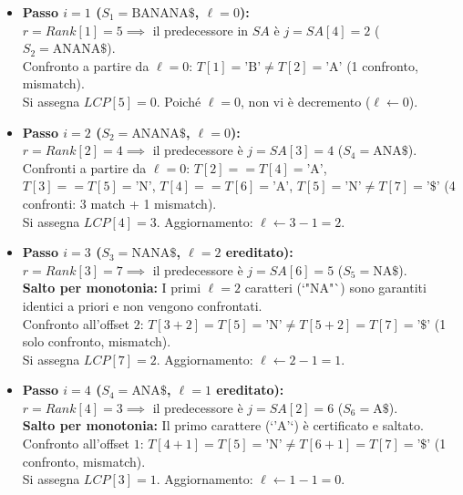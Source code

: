 \begin{itemize}
  \item \textbf{Passo $i = 1$ ($S_1 = \text{BANANA}\$$, $\ell = 0$):} \\
  $r = Rank[1] = 5 \implies$ il predecessore in $SA$ \`e $j = SA[4] = 2$ ($S_2 = \text{ANANA}\$$). \\
  Confronto a partire da $\ell = 0$: $T[1] = \text{'B'} \neq T[2] = \text{'A'}$ (1 confronto, mismatch). \\
  Si assegna $LCP[5] = 0$. Poich\'e $\ell = 0$, non vi \`e decremento ($\ell \leftarrow 0$).

  \item \textbf{Passo $i = 2$ ($S_2 = \text{ANANA}\$$, $\ell = 0$):} \\
  $r = Rank[2] = 4 \implies$ il predecessore \`e $j = SA[3] = 4$ ($S_4 = \text{ANA}\$$). \\
  Confronti a partire da $\ell = 0$:
  $T[2] == T[4] = \text{'A'}$, $T[3] == T[5] = \text{'N'}$, $T[4] == T[6] = \text{'A'}$, $T[5] = \text{'N'} \neq T[7] = \text{'\$'}$ (4 confronti: 3 match + 1 mismatch). \\
  Si assegna $LCP[4] = 3$. Aggiornamento: $\ell \leftarrow 3 - 1 = 2$.

  \item \textbf{Passo $i = 3$ ($S_3 = \text{NANA}\$$, $\ell = 2$ ereditato):} \\
  $r = Rank[3] = 7 \implies$ il predecessore \`e $j = SA[6] = 5$ ($S_5 = \text{NA}\$$). \\
  \textbf{Salto per monotonia:} I primi $\ell = 2$ caratteri (`"NA"`) sono garantiti identici a priori e non vengono confrontati. \\
  Confronto all'offset $2$: $T[3 + 2] = T[5] = \text{'N'} \neq T[5 + 2] = T[7] = \text{'\$'}$ (1 solo confronto, mismatch). \\
  Si assegna $LCP[7] = 2$. Aggiornamento: $\ell \leftarrow 2 - 1 = 1$.

  \item \textbf{Passo $i = 4$ ($S_4 = \text{ANA}\$$, $\ell = 1$ ereditato):} \\
  $r = Rank[4] = 3 \implies$ il predecessore \`e $j = SA[2] = 6$ ($S_6 = \text{A}\$$). \\
  \textbf{Salto per monotonia:} Il primo carattere (`'A'`) \`e certificato e saltato. \\
  Confronto all'offset $1$: $T[4 + 1] = T[5] = \text{'N'} \neq T[6 + 1] = T[7] = \text{'\$'}$ (1 confronto, mismatch). \\
  Si assegna $LCP[3] = 1$. Aggiornamento: $\ell \leftarrow 1 - 1 = 0$.


\end{itemize}
